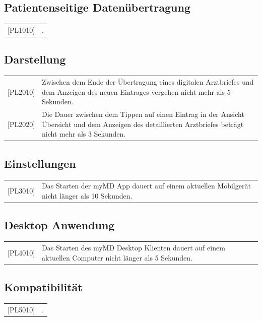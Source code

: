 \documentclass[a4paper]{scrreprt}
\begin{document}
\subsection{Patientenseitige Datenübertragung}
\begin{tabular}{lll}
[PL1010]&  \multicolumn{2}{p{12cm}}{.}\\

\end{tabular}

\subsection{Darstellung}
\begin{tabular}{lll}
[PL2010]&  \multicolumn{2}{p{12cm}}{Zwischen dem Ende der Übertragung eines digitalen Arztbriefes und dem Anzeigen des neuen Eintrages vergehen nicht mehr als 5 Sekunden.}\\
{[PL2020]}&  \multicolumn{2}{p{12cm}}{Die Dauer zwischen dem Tippen auf einen Eintrag in der Ansicht Übersicht und dem Anzeigen des detaillierten Arztbriefes beträgt nicht mehr als 3 Sekunden.}\\

\end{tabular}

\subsection{Einstellungen}
\begin{tabular}{lll}
[PL3010]&  \multicolumn{2}{p{12cm}}{Das Starten der myMD App dauert auf einem aktuellen Mobilgerät nicht länger als 10 Sekunden.}\\


\end{tabular}

\subsection{Desktop Anwendung}
\begin{tabular}{lll}
[PL4010]&  \multicolumn{2}{p{12cm}}{Das Starten des myMD Desktop Klienten dauert auf einem aktuellen Computer nicht länger als 5 Sekunden.}\\

\end{tabular}

\subsection{Kompatibilität}
\begin{tabular}{lll}
[PL5010]&  \multicolumn{2}{p{12cm}}{.}\\

\end{tabular}
\end{document}
